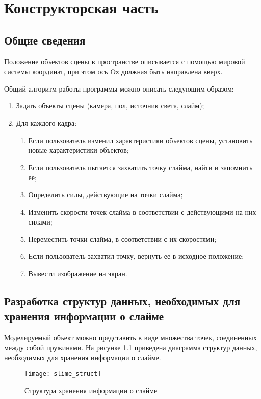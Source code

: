 \chapter{Конструкторская часть}

\section{Общие сведения}

Положение объектов сцены в пространстве описывается с помощью
мировой системы координат, при этом ось Oz должная быть направлена вверх.

Общий алгоритм работы программы можно описать следующим образом:

\begin{enumerate}
	\item Задать объекты сцены (камера, пол, источник света, слайм);
	\item Для каждого кадра:
	\begin{enumerate}
		\item Если пользователь изменил характеристики объектов сцены, установить новые характеристики объектов;
		\item Если пользователь пытается захватить точку слайма, найти и запомнить ее;
		\item Определить силы, действующие на точки слайма;
		\item Изменить скорости точек слайма в соответствии с действующими на них силами;
		\item Переместить точки слайма, в соответствии с их скоростями;
		\item Если пользователь захватил точку, вернуть ее в исходное положение;
		\item Вывести изображение на экран.
	\end{enumerate}
\end{enumerate}

\section{Разработка структур данных, необходимых для хранения информации о слайме}

Моделируемый объект можно представить в виде множества точек, соединенных между собой пружинами. На рисунке \ref{slime_struct} приведена диаграмма структур данных, необходимых для хранения информации о слайме.

\begin{figure}[H]
	\centering
	\texttt{[image: slime\_struct]}
	\caption{Структура хранения информации о слайме}
	\label{slime_struct}
\end{figure}

